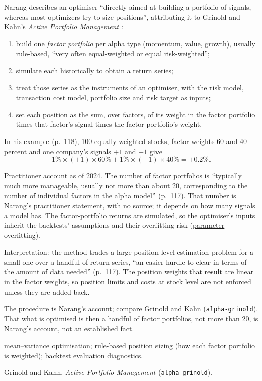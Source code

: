 \begin{qfmethod}\label{meth:signal-portfolio-allocation}
 Narang describes an optimiser ``directly aimed at building a portfolio of signals, whereas most optimizers try to size positions'', attributing it to Grinold and Kahn's \emph{Active Portfolio Management} \citep[chap.~6, sec.~6.2.2.4, pp.~117--118]{s7-narang}:
\begin{enumerate}
\item build one \emph{factor portfolio} per alpha type (momentum, value, growth), usually rule-based, ``very often equal-weighted or equal risk-weighted'';
\item simulate each historically to obtain a return series;
\item treat those series as the instruments of an optimiser, with the risk model, transaction cost model, portfolio size and risk target as inputs;
\item set each position as the sum, over factors, of its weight in the factor portfolio times that factor's signal times the factor portfolio's weight.
\end{enumerate}
In his example (p.~118), 100 equally weighted stocks, factor weights 60 and 40 percent and one company's signals $+1$ and $-1$ give
\[ 1\%\times(+1)\times60\%+1\%\times(-1)\times40\%=+0.2\%. \]

 Practitioner account as of 2024. The number of factor portfolios is ``typically much more manageable, usually not more than about 20, corresponding to the number of individual factors in the alpha model'' (p.~117). That number is Narang's practitioner statement, with no source; it depends on how many signals a model has. The factor-portfolio returns are simulated, so the optimiser's inputs inherit the backtests' assumptions and their overfitting risk (\hyperref[pit:parameter-overfitting]{parameter overfitting}).

 Interpretation: the method trades a large position-level estimation problem for a small one over a handful of return series, ``an easier hurdle to clear in terms of the amount of data needed'' (p.~117). The position weights that result are linear in the factor weights, so position limits and costs at stock level are not enforced unless they are added back.

 The procedure is Narang's account; compare Grinold and Kahn (\nolinkurl{alpha-grinold}). That what is optimised is then a handful of factor portfolios, not more than 20, is Narang's account, not an established fact.

 \hyperref[mod:mean-variance-portfolio-optimisation]{mean--variance optimisation}; \hyperref[meth:rule-based-position-sizing]{rule-based position sizing} (how each factor portfolio is weighted); \hyperref[meth:backtest-evaluation-diagnostics]{backtest evaluation diagnostics}.

 Grinold and Kahn, \emph{Active Portfolio Management} (\nolinkurl{alpha-grinold}).

\end{qfmethod}

